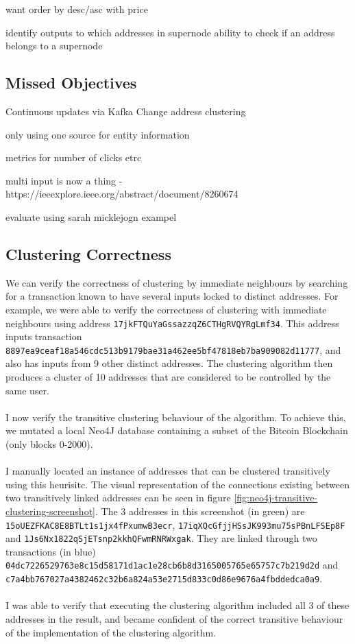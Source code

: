 want order by desc/asc with price

identify outputs to which addresses in supernode
ability to check if an address belongs to a supernode 


\subsection{Missed Objectives}
Continuous updates via Kafka
Change address clustering


only using one source for entity information 

metrics for number of clicks etrc


multi input is now a thing - https://ieeexplore.ieee.org/abstract/document/8260674

evaluate using sarah micklejogn exampel 


\subsection{Clustering Correctness}
We can verify the correctness of clustering by immediate neighbours by searching for a transaction known to have several inputs locked to distinct addresses. For example, we were able to verify the correctness of clustering with immediate neighbours using address \texttt{17jkFTQuYaGssazzqZ6CTHgRVQYRgLmf34}. This address inputs transaction \\\texttt{8897ea9ceaf18a546cdc513b9179bae31a462ee5bf47818eb7ba909082d11777}, and also has inputs from 9 other distinct addresses. The clustering algorithm then produces a cluster of 10 addresses that are considered to be controlled by the same user. 
\\\\
I now verify the transitive clustering behaviour of the algorithm.  
To achieve this, we mutated a local Neo4J database containing a subset of the Bitcoin Blockchain (only blocks 0-2000). 
\\\\
I manually located an instance of addresses that can be clustered transitively using this heurisitc. The visual representation of the connections existing between two transitively linked addresses can be seen in figure \ref{fig:neo4j-transitive-clustering-screenshot}. The 3 addresses in this screenshot (in green) are \texttt{15oUEZFKAC8E8BTLt1s1jx4fPxumwB3ecr}, \texttt{17iqXQcGfjjHSsJK993mu75sPBnLFSEp8F} and \texttt{1Js6Nx1822qSjETsnp2kkhQFwmRNRWxgak}. They are linked through two transactions (in blue) \texttt{04dc7226529763e8c15d58171d1ac1e28cb6b8d3165005765e65757c7b219d2d} and \texttt{c7a4bb767027a4382462c32b6a824a53e2715d833c0d86e9676a4fbddedca0a9}. 
\\\\
I was able to verify that executing the clustering algorithm included all 3 of these addresses in the result, and became confident of the correct transitive behaviour of the implementation of the clustering algorithm. 

